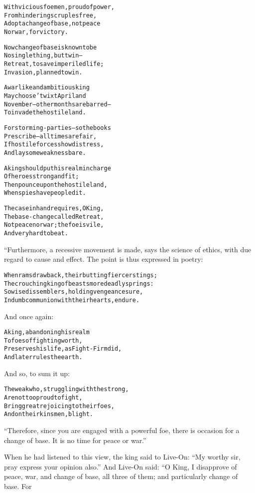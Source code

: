 \documentclass{article}
\renewenvironment{verbatim}{\begin{alltt}\normalfont\begin{centering}}{\end{centering}\end{alltt}}
\begin{document}
\begin{verbatim}
With vicious foemen, proud of power,
    From hindering scruples free,
Adopt a change of base, not peace
    Nor war, for victory.

Now change of base is known to be
    No single thing, but twin--
Retreat, to save imperiled life;
    Invasion, planned to win.

A warlike and ambitious king
    May choose 'twixt April and
November--other months are barred--
    To invade the hostile land.

For storming-parties--so the books
    Prescribe--all times are fair,
If hostile forces show distress,
    And lay some weakness bare.

A king should put his realm in charge
    Of heroes strong and fit;
Then pounce upon the hostile land,
    When spies have peopled it.

The case in hand requires, O King,
    The base-change called Retreat,
Not peace nor war; the foe is vile,
    And very hard to beat.
\end{verbatim}
“Furthermore, a recessive movement is made, says the science of
ethics, with due regard to cause and effect. The point is thus
expressed in poetry:

\begin{verbatim}
When rams draw back, their butting fiercer stings;
The crouching king of beasts more deadly springs:
So wise dissemblers, holding vengeance sure,
In dumb communion with their hearts, endure.
\end{verbatim}
And once again:

\begin{verbatim}
A king, abandoning his realm
    To foes of fighting worth,
Preserves his life, as Fight-Firm did,
    And later rules the earth.
\end{verbatim}
And so, to sum it up:

\begin{verbatim}
The weak who, struggling with the strong,
    Are not too proud to fight,
Bring great rejoicing to their foes,
    And on their kinsmen, blight.
\end{verbatim}
``Therefore, since you are engaged with a powerful foe, there is occasion for a change of base. It is no time for peace or war.''

When he had listened to this view, the king said to Live-On:
``My worthy sir, pray express your opinion also.'' And Live-On
said: “O King, I disapprove of peace, war, and change of base, all
three of them; and particularly change of base. For
\end{document}
